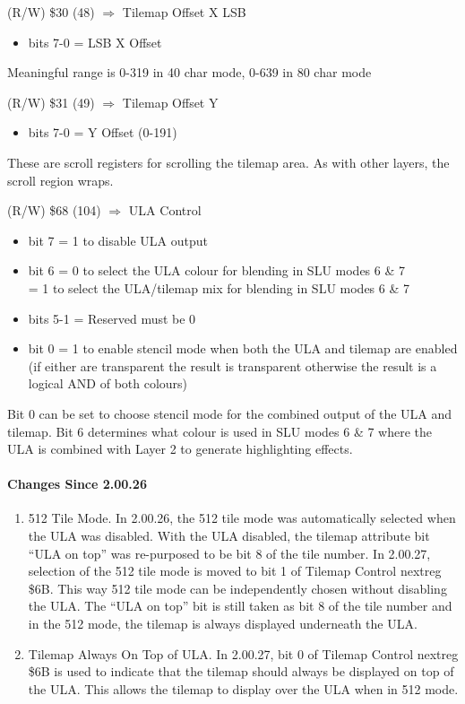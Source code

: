 (R/W) \$30 (48) $\Rightarrow$ Tilemap Offset X LSB
\begin{itemize}
\item[] bits 7-0 = LSB X Offset
\end{itemize}
Meaningful range is 0-319 in 40 char mode, 0-639 in 80 char mode

(R/W) \$31 (49) $\Rightarrow$ Tilemap Offset Y
\begin{itemize}
\item[] bits 7-0 = Y Offset (0-191)
\end{itemize}
These are scroll registers for scrolling the tilemap area. As with
other layers, the scroll region wraps.

(R/W) \$68 (104) $\Rightarrow$ ULA Control
\begin{itemize}
\item[] bit 7    = 1 to disable ULA output
\item[] bit 6 = 0 to select the ULA colour for blending in SLU modes 6
  \& 7\\
  = 1 to select the ULA/tilemap mix for blending in SLU modes 6 \& 7
\item[] bits 5-1 = Reserved must be 0
\item[] bit 0 = 1 to enable stencil mode when both the ULA and tilemap
  are enabled\\
  (if either are transparent the result is transparent otherwise the
  result is a logical AND of both colours)
\end{itemize}

Bit 0 can be set to choose stencil mode for the combined output of the
ULA and tilemap. Bit 6 determines what colour is used in SLU modes 6 \&
7 where the ULA is combined with Layer 2 to generate highlighting
effects.

\paragraph{Changes Since 2.00.26}

\begin{enumerate}
\item 512 Tile Mode. In 2.00.26, the 512 tile mode was automatically
  selected when the ULA was disabled. With the ULA disabled, the
  tilemap attribute bit “ULA on top” was re-purposed to be bit 8 of
  the tile number. In 2.00.27, selection of the 512 tile mode is moved
  to bit 1 of Tilemap Control nextreg \$6B. This way 512 tile mode can
  be independently chosen without disabling the ULA. The “ULA on top”
  bit is still taken as bit 8 of the tile number and in the 512 mode,
  the tilemap is always displayed underneath the ULA.
\item Tilemap Always On Top of ULA. In 2.00.27, bit 0 of Tilemap
  Control nextreg \$6B is used to indicate that the tilemap should
  always be displayed on top of the ULA. This allows the tilemap to
  display over the ULA when in 512 mode.
\end{enumerate}

